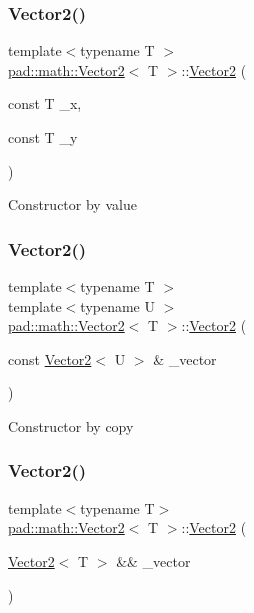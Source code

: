 \subsubsection{\texorpdfstring{Vector2()}{Vector2()}\hspace{0.1cm}{\footnotesize\ttfamily [2/4]}}
{\footnotesize\ttfamily template$<$typename T $>$ \\
\mbox{\hyperlink{structpad_1_1math_1_1_vector2}{pad\+::math\+::\+Vector2}}$<$ T $>$\+::\mbox{\hyperlink{structpad_1_1math_1_1_vector2}{Vector2}} (\begin{DoxyParamCaption}\item[{const T}]{\+\_\+x,  }\item[{const T}]{\+\_\+y }\end{DoxyParamCaption})}

Constructor by value \mbox{\label{structpad_1_1math_1_1_vector2_aec2b96f829aab2b0676be107f35ba20d}} 
\subsubsection{\texorpdfstring{Vector2()}{Vector2()}\hspace{0.1cm}{\footnotesize\ttfamily [3/4]}}
{\footnotesize\ttfamily template$<$typename T $>$ \\
template$<$typename U $>$ \\
\mbox{\hyperlink{structpad_1_1math_1_1_vector2}{pad\+::math\+::\+Vector2}}$<$ T $>$\+::\mbox{\hyperlink{structpad_1_1math_1_1_vector2}{Vector2}} (\begin{DoxyParamCaption}\item[{const \mbox{\hyperlink{structpad_1_1math_1_1_vector2}{Vector2}}$<$ U $>$ \&}]{\+\_\+vector }\end{DoxyParamCaption})}

Constructor by copy \mbox{\label{structpad_1_1math_1_1_vector2_aa13fef545bfcfad2d085505821d9af37}} 
\subsubsection{\texorpdfstring{Vector2()}{Vector2()}\hspace{0.1cm}{\footnotesize\ttfamily [4/4]}}
{\footnotesize\ttfamily template$<$typename T$>$ \\
\mbox{\hyperlink{structpad_1_1math_1_1_vector2}{pad\+::math\+::\+Vector2}}$<$ T $>$\+::\mbox{\hyperlink{structpad_1_1math_1_1_vector2}{Vector2}} (\begin{DoxyParamCaption}\item[{\mbox{\hyperlink{structpad_1_1math_1_1_vector2}{Vector2}}$<$ T $>$ \&\&}]{\+\_\+vector }\end{DoxyParamCaption})\hspace{0.3cm}{\ttfamily [default]}}

